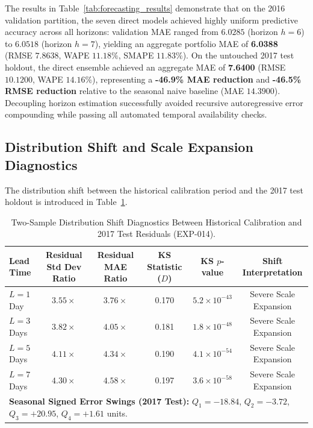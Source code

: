 \documentclass[11pt,a4paper]{article}
\begin{document}
The results in Table~\ref{tab:forecasting_results} demonstrate that on the 2016 validation partition, the seven direct models achieved highly uniform predictive accuracy across all horizons: validation MAE ranged from $6.0285$ (horizon $h=6$) to $6.0518$ (horizon $h=7$), yielding an aggregate portfolio MAE of \textbf{6.0388} (RMSE $7.8638$, WAPE $11.18\%$, SMAPE $11.83\%$). On the untouched 2017 test holdout, the direct ensemble achieved an aggregate MAE of \textbf{7.6400} (RMSE $10.1200$, WAPE $14.16\%$), representing a \textbf{-46.9\% MAE reduction} and \textbf{-46.5\% RMSE reduction} relative to the seasonal naive baseline (MAE $14.3900$). Decoupling horizon estimation successfully avoided recursive autoregressive error compounding while passing all automated temporal availability checks.

\subsection{Distribution Shift and Scale Expansion Diagnostics}
\label{sec:res_shift}
The distribution shift between the historical calibration period and the 2017 test holdout is introduced in Table~\ref{tab:shift_diagnostics}.

\begin{table}[htbp]
\centering
\small
\caption{Two-Sample Distribution Shift Diagnostics Between Historical Calibration and 2017 Test Residuals (EXP-014).}
\label{tab:shift_diagnostics}
\begin{tabular}{lccccc}
\toprule
\textbf{Lead Time} & \textbf{Residual Std Dev Ratio} & \textbf{Residual MAE Ratio} & \textbf{KS Statistic ($D$)} & \textbf{KS $p$-value} & \textbf{Shift Interpretation} \\
\midrule
$L=1$ Day  & $3.55\times$ & $3.76\times$ & 0.170 & $5.2 \times 10^{-43}$ & Severe Scale Expansion \\
$L=3$ Days & $3.82\times$ & $4.05\times$ & 0.181 & $1.8 \times 10^{-48}$ & Severe Scale Expansion \\
$L=5$ Days & $4.11\times$ & $4.34\times$ & 0.190 & $4.1 \times 10^{-54}$ & Severe Scale Expansion \\
$L=7$ Days & $4.30\times$ & $4.58\times$ & 0.197 & $3.6 \times 10^{-58}$ & Severe Scale Expansion \\
\midrule
\multicolumn{6}{l}{\textbf{Seasonal Signed Error Swings (2017 Test):} $Q_1 = -18.84$, $Q_2 = -3.72$, $Q_3 = +20.95$, $Q_4 = +1.61$ units.} \\
\bottomrule
\end{tabular}
\end{table}
\end{document}
